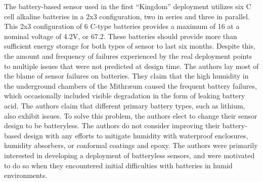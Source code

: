 The battery-based sensor used in the first ``Kingdom'' deployment utilizes six C cell alkaline batteries in a 2x3 configuration, two in series and three in parallel.
This 2x3 configuration of 6 C-type batteries provides a maximum of 16\ssi{\Ah} at a nominal voltage of 4.2V, or 67.2\ssi{\Wh}.
These batteries should provide more than sufficient energy storage for both types of sensor to last six months.
Despite this, the amount and
frequency of failures experienced by the real deployment points to multiple
issues that were not predicted at design time.
The authors lay most of the blame of
sensor failures on batteries.
They claim that the high humidity in the
underground chambers of the Mithræum caused the frequent battery failures, which occasionally included visible degradation in the form of leaking battery acid.
The authors claim that different primary battery types, such as
lithium, also exhibit issues.
To solve this problem, the authors elect to change their sensor design to be batteryless.
The authors do not consider improving their battery-based design with any efforts to mitigate
humidity with waterproof enclosures, humidity absorbers, or conformal coatings and epoxy.
The authors were primarily interested in developing a
deployment of batteryless sensors, and were motivated to do so when they encountered initial difficulties with
batteries in humid environments.

